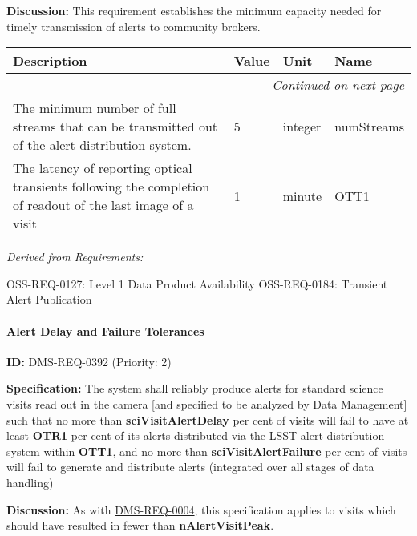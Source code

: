 \documentclass[SE,toc,lsstdraft]{lsstdoc}
\makeatletter
\newcommand{\paramname}[1]{\hspace{0pt}#1}
\newcommand{\unitname}[1]{\hspace{0pt}#1}
\newenvironment{parameters}[0]{%
\setlength\LTleft{0pt}
\setlength\LTright{\fill}
\begin{small}
\begin{longtable}[]{|p{0.49\textwidth}|l|p{0.6in}|p{1.70in}@{}|}

\hline \textbf{Description} & \textbf{Value} & \textbf{Unit} & \textbf{Name} \\ \hline
\endhead

\hline \multicolumn{4}{r}{\emph{Continued on next page}} \\
\endfoot

\hline\hline
\endlastfoot
}{%
\hline
\end{longtable}
\end{small}
}
\makeatother
\begin{document}
\textbf{Discussion:}
This requirement establishes the minimum capacity needed for timely transmission of alerts to community brokers.

\begin{parameters}
The minimum number of full streams that can be transmitted out of the alert distribution system.
&
5
&
\unitname{%
integer
}
&
\paramname{%
numStreams
} \\\hline
The latency of reporting optical transients following the completion of readout of the last image of a visit
&
1
&
\unitname{%
minute
}
&
\paramname{%
OTT1
} \\\hline
\end{parameters}

\emph{Derived from Requirements:}

OSS-REQ-0127:
Level 1 Data Product Availability \newline
OSS-REQ-0184:
Transient Alert Publication \newline

\paragraph{Alert Delay and Failure Tolerances}\hfill  %

\label{DMS-REQ-0392}
\textbf{ID:} DMS-REQ-0392 (Priority: 2)

\textbf{Specification:}
The system shall reliably produce alerts for standard science visits read out in the camera [and specified to be analyzed by Data Management] such that no more than \textbf{sciVisitAlertDelay} per cent of visits will fail to have at least \textbf{OTR1} per cent of its alerts distributed via the LSST alert distribution system within \textbf{OTT1}, and no more than \textbf{sciVisitAlertFailure} per cent of visits will fail to generate and distribute alerts (integrated over all stages of data handling)

\textbf{Discussion:}
As with \hyperref[DMS-REQ-0004]{DMS-REQ-0004}, this specification applies to visits which should have resulted in fewer than \textbf{nAlertVisitPeak}.
\end{document}
